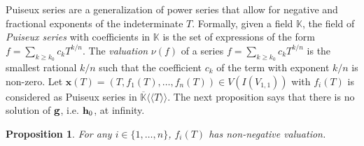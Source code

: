 \documentclass[11pt]{article}
\numberwithin{Property}{section}
\numberwithin{Theorem}{section}
\newtheorem{Proposition}{Proposition}%
\numberwithin{Proposition}{section}
\numberwithin{Lemma}{section}
\numberwithin{Corollary}{section}
\numberwithin{Definition}{section}
\numberwithin{Remark}{section}
\numberwithin{Conjecture}{section}
\numberwithin{Problem}{section}
\numberwithin{Claim}{section}
\theoremstyle{definition}
\numberwithin{Example}{section}
\renewcommand{\ge}{\geqslant}
\def\bar{\overline}
\renewcommand{\ge}{\geqslant} %
\newcommand{\field}{\mathbb{K}} %
\begin{document}
 Puiseux series are a generalization of power series that allow for negative and fractional exponents of the indeterminate $T$. Formally, given a field $\field$, the field of \emph{Puiseux series} with coefficients in $\field$ is the set of expressions of the form $f = \sum_{k \ge k_0}c_kT^{k/n}$. The \emph{valuation} $\nu(f)$ of a series $f = \sum_{k \ge k_0}c_kT^{k/n}$ is the smallest rational $k/n$ such that the coefficient $c_k$ of the term with exponent $k/n$ is non-zero. Let $\mathbf{x}(T) = (T, f_1(T), \ldots, f_n(T)) \in V(I(V_{1,1}))$ with $f_i(T)$ is considered as Puiseux series in $\bar{\field}\langle\langle T \rangle\rangle$. The next proposition says that there is no solution of ${\bf g}$, i.e. ${\bf h}_0$, at infinity. 
\begin{Proposition}\label{valuation}
For any $i \in \{1, \ldots, n\}$, $f_i(T)$ has non-negative valuation. 
\end{Proposition}
\end{document}
